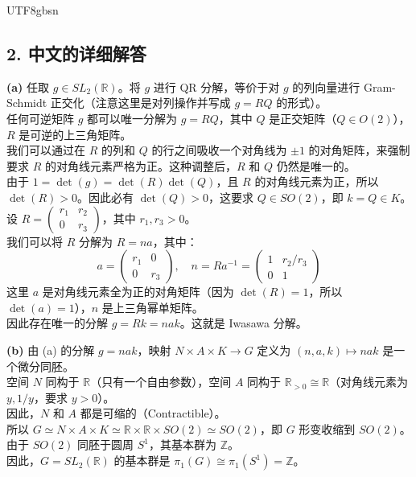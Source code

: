 \documentclass{article}
\begin{document}
\begin{CJK*}{UTF8}{gbsn}
\subsection*{2. 中文的详细解答}
\textbf{(a)} 任取 $g \in SL_2(\mathbb{R})$。将 $g$ 进行 QR 分解，等价于对 $g$ 的列向量进行 Gram-Schmidt 正交化（注意这里是对列操作并写成 $g = R Q$ 的形式）。\\
任何可逆矩阵 $g$ 都可以唯一分解为 $g = R Q$，其中 $Q$ 是正交矩阵（$Q \in O(2)$），$R$ 是可逆的上三角矩阵。\\
我们可以通过在 $R$ 的列和 $Q$ 的行之间吸收一个对角线为 $\pm 1$ 的对角矩阵，来强制要求 $R$ 的对角线元素严格为正。这种调整后，$R$ 和 $Q$ 仍然是唯一的。\\
由于 $1 = \det(g) = \det(R)\det(Q)$，且 $R$ 的对角线元素为正，所以 $\det(R) > 0$。因此必有 $\det(Q) > 0$，这要求 $Q \in SO(2)$，即 $k = Q \in K$。\\
设 $R = \begin{pmatrix} r_1 & r_2 \\ 0 & r_3 \end{pmatrix}$，其中 $r_1, r_3 > 0$。\\
我们可以将 $R$ 分解为 $R = n a$，其中：
$$ a = \begin{pmatrix} r_1 & 0 \\ 0 & r_3 \end{pmatrix}, \quad n = R a^{-1} = \begin{pmatrix} 1 & r_2/r_3 \\ 0 & 1 \end{pmatrix} $$
这里 $a$ 是对角线元素全为正的对角矩阵（因为 $\det(R)=1$，所以 $\det(a)=1$），$n$ 是上三角幂单矩阵。\\
因此存在唯一的分解 $g = R k = n a k$。这就是 Iwasawa 分解。

\textbf{(b)} 由 (a) 的分解 $g = nak$，映射 $N \times A \times K \to G$ 定义为 $(n, a, k) \mapsto nak$ 是一个微分同胚。\\
空间 $N$ 同构于 $\mathbb{R}$（只有一个自由参数），空间 $A$ 同构于 $\mathbb{R}_{>0} \cong \mathbb{R}$（对角线元素为 $y, 1/y$，要求 $y>0$）。\\
因此，$N$ 和 $A$ 都是可缩的（Contractible）。\\
所以 $G \simeq N \times A \times K \simeq \mathbb{R} \times \mathbb{R} \times SO(2) \simeq SO(2)$，即 $G$ 形变收缩到 $SO(2)$。\\
由于 $SO(2)$ 同胚于圆周 $S^1$，其基本群为 $\mathbb{Z}$。\\
因此，$G = SL_2(\mathbb{R})$ 的基本群是 $\pi_1(G) \cong \pi_1(S^1) = \mathbb{Z}$。


\end{CJK*}
\end{document}
